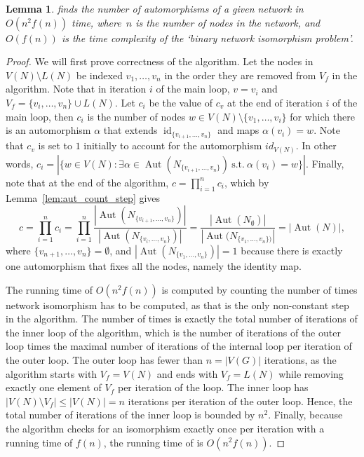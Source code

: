 \documentclass{article}
\newtheorem{lemma}{Lemma}
\theoremstyle{definition}
\DeclareMathOperator{\Aut}{Aut}
\DeclareMathOperator{\id}{id}
\begin{document}
\begin{lemma}\label{lem:algAUTOM}
 finds the number of automorphisms of a given network in~$O(n^2f(n))$ time, where~$n$ is the number of nodes in the network, and~$O(f(n))$ is the time complexity of the `binary network isomorphism problem'.
\end{lemma}
\begin{proof}
    We will first prove correctness of the algorithm. Let the nodes in $V(N)\setminus L(N)$ be indexed $v_1, \ldots, v_n$ in the order they are removed from $V_f$ in the algorithm.
    Note that in iteration $i$ of the main loop, $v=v_i$ and $V_f=\{v_i,\ldots, v_n\}\cup L(N)$. 
    Let $c_i$ be the value of $c_v$ at the end of iteration $i$ of the main loop, then $c_i$ is the number of nodes $w \in V(N)\setminus \{v_1, \ldots, v_i\}$ for which there is an automorphism $\alpha$ that extends $\id_{\{v_{i+1},\ldots, v_n\}}$ and maps $\alpha(v_i)=w$.
    Note that $c_v$ is set to $1$ initially to account for the automorphism $id_{V(N)}$. 
    In other words, $c_i=|\{w\in V(N): \exists \alpha \in \Aut(N_{\{v_{i+1},\ldots, v_n\}}) \mathrm{~s.t.~} \alpha(v_i)=w \}|$.
    Finally, note that at the end of the algorithm, $c = \prod_{i=1}^n c_i$, which by Lemma~\ref{lem:aut_count_step} gives
    \[c = \prod_{i=1}^n c_i = \prod_{i=1}^n \frac{|\Aut(N_{\{v_{i+1},\ldots, v_n\}})|}{|\Aut(N_{\{v_i,\ldots, v_n\}})|} = \frac{|\Aut(N_{\emptyset})|}{|\Aut(N_{\{v_1,\ldots, v_n\})}|} = |\Aut(N)|, \]
    where $\{v_{n+1},\ldots, v_n\} = \emptyset$, and $|\Aut(N_{\{v_1,\ldots, v_n\}})|=1$ because there is exactly one automorphism that fixes all the nodes, namely the identity map.

    The running time of $O(n^2 f(n))$ is computed by counting the number of times network isomorphism has to be computed, as that is the only non-constant step in the algorithm. 
    The number of times is exactly the total number of iterations of the inner loop of the algorithm, which is the number of iterations of the outer loop times the maximal number of iterations of the internal loop per iteration of the outer loop.
    The outer loop has fewer than $n=|V(G)|$ iterations, as the algorithm starts with $V_f=V(N)$ and ends with $V_f=L(N)$ while removing exactly one element of $V_f$ per iteration of the loop. 
    The inner loop has $|V(N)\setminus V_f| \leq | V(N) | =n$ iterations per iteration of the outer loop. Hence, the total number of iterations of the inner loop is bounded by $n^2$. 
    Finally, because the algorithm checks for an isomorphism exactly once per iteration with a running time of $f(n)$, the running time of  is $O(n^2 f(n))$.
\end{proof}
\end{document}
